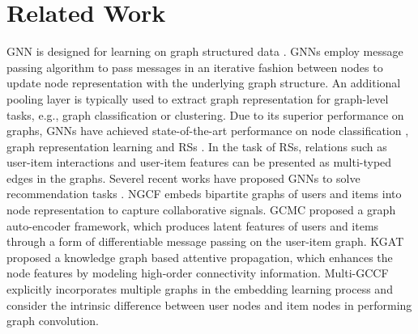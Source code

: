 \documentclass[runningheads, envcountsame, a4paper]{llncs}
\begin{document}
 \section{Related Work}
GNN is designed for learning on graph structured data \cite{scarselli2008graph,bruna2013spectral,kipf2016semi}. GNNs employ message passing algorithm to pass messages in an iterative fashion between nodes to update node representation with the underlying graph structure.
An additional pooling layer is typically used to extract graph representation for graph-level tasks, e.g., graph classification or clustering.  
Due to its superior performance on graphs, GNNs have achieved state-of-the-art performance on node classification \cite{kipf2016semi}, graph representation learning \cite{hamilton2017inductive} and RSs \cite{ying2018graph}. 
In the task of RSs, relations such as user-item interactions and user-item features can be presented as multi-typed edges in the graphs. 
Severel recent works have proposed GNNs to solve recommendation tasks \cite{wang2019neural,wang2019kgat,berg2017graph}. 
NGCF \cite{wang2019neural} embeds bipartite graphs of users and items into node representation to capture collaborative signals. 
GCMC \cite{berg2017graph} proposed a graph auto-encoder framework, which produces latent features of users and items through a form of differentiable message passing on the user-item graph. KGAT \cite{wang2019kgat} proposed a knowledge graph based attentive propagation, which enhances the node features by modeling high-order connectivity information. 
Multi-GCCF \cite{sun2019multi}  explicitly incorporates multiple  graphs in the embedding learning process and consider the intrinsic difference between user nodes and item nodes in performing graph convolution.
\end{document}
